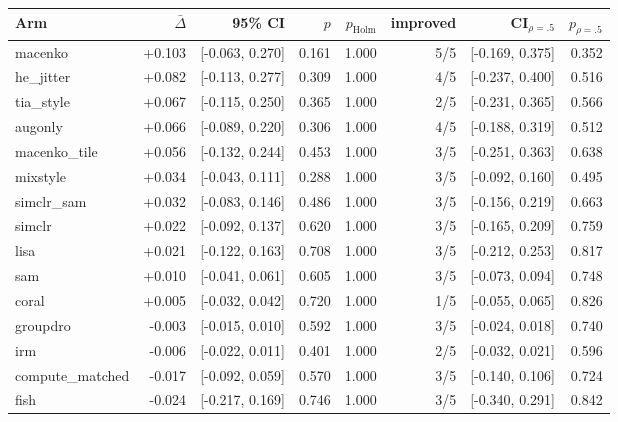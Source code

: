 \begin{tabular}{lrrrrrrr}
\toprule
Arm & $\bar\Delta$ & 95\% CI & $p$ & $p_\text{Holm}$ & improved & CI$_{\rho=.5}$ & $p_{\rho=.5}$ \\
\midrule
macenko & +0.103 & [-0.063, 0.270] & 0.161 & 1.000 & 5/5 & [-0.169, 0.375] & 0.352 \\
he\_jitter & +0.082 & [-0.113, 0.277] & 0.309 & 1.000 & 4/5 & [-0.237, 0.400] & 0.516 \\
tia\_style & +0.067 & [-0.115, 0.250] & 0.365 & 1.000 & 2/5 & [-0.231, 0.365] & 0.566 \\
augonly & +0.066 & [-0.089, 0.220] & 0.306 & 1.000 & 4/5 & [-0.188, 0.319] & 0.512 \\
macenko\_tile & +0.056 & [-0.132, 0.244] & 0.453 & 1.000 & 3/5 & [-0.251, 0.363] & 0.638 \\
mixstyle & +0.034 & [-0.043, 0.111] & 0.288 & 1.000 & 3/5 & [-0.092, 0.160] & 0.495 \\
simclr\_sam & +0.032 & [-0.083, 0.146] & 0.486 & 1.000 & 3/5 & [-0.156, 0.219] & 0.663 \\
simclr & +0.022 & [-0.092, 0.137] & 0.620 & 1.000 & 3/5 & [-0.165, 0.209] & 0.759 \\
lisa & +0.021 & [-0.122, 0.163] & 0.708 & 1.000 & 3/5 & [-0.212, 0.253] & 0.817 \\
sam & +0.010 & [-0.041, 0.061] & 0.605 & 1.000 & 3/5 & [-0.073, 0.094] & 0.748 \\
coral & +0.005 & [-0.032, 0.042] & 0.720 & 1.000 & 1/5 & [-0.055, 0.065] & 0.826 \\
groupdro & -0.003 & [-0.015, 0.010] & 0.592 & 1.000 & 3/5 & [-0.024, 0.018] & 0.740 \\
irm & -0.006 & [-0.022, 0.011] & 0.401 & 1.000 & 2/5 & [-0.032, 0.021] & 0.596 \\
compute\_matched & -0.017 & [-0.092, 0.059] & 0.570 & 1.000 & 3/5 & [-0.140, 0.106] & 0.724 \\
fish & -0.024 & [-0.217, 0.169] & 0.746 & 1.000 & 3/5 & [-0.340, 0.291] & 0.842 \\
\bottomrule
\end{tabular}
